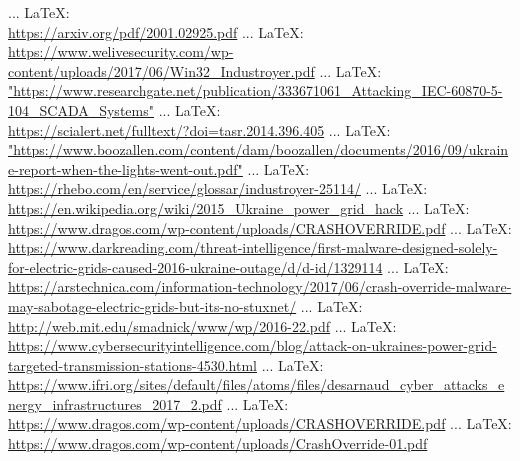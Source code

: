 \begin{thebibliography}{99}
{{{{		 ... \LaTeX:\\ \url{https://arxiv.org/pdf/2001.02925.pdf}
		 ... \LaTeX:\\ \url{https://www.welivesecurity.com/wp-content/uploads/2017/06/Win32_Industroyer.pdf}
		 ... \LaTeX:\\ \url{"https://www.researchgate.net/publication/333671061_Attacking_IEC-60870-5-104_SCADA_Systems"}
		 ... \LaTeX:\\ \url{https://scialert.net/fulltext/?doi=tasr.2014.396.405}
		 ... \LaTeX:\\ \url{"https://www.boozallen.com/content/dam/boozallen/documents/2016/09/ukraine-report-when-the-lights-went-out.pdf"}
		 ... \LaTeX:\\ \url{https://rhebo.com/en/service/glossar/industroyer-25114/}
		 ... \LaTeX:\\ \url{https://en.wikipedia.org/wiki/2015_Ukraine_power_grid_hack}
		 ... \LaTeX:\\ \url{https://www.dragos.com/wp-content/uploads/CRASHOVERRIDE.pdf}
		 ... \LaTeX:\\ \url{https://www.darkreading.com/threat-intelligence/first-malware-designed-solely-for-electric-grids-caused-2016-ukraine-outage/d/d-id/1329114}
		 ... \LaTeX:\\ \url{https://arstechnica.com/information-technology/2017/06/crash-override-malware-may-sabotage-electric-grids-but-its-no-stuxnet/}
		 ... \LaTeX:\\ \url{http://web.mit.edu/smadnick/www/wp/2016-22.pdf}
		 ... \LaTeX:\\ \url{https://www.cybersecurityintelligence.com/blog/attack-on-ukraines-power-grid-targeted-transmission-stations-4530.html}
		 ... \LaTeX:\\ \url{https://www.ifri.org/sites/default/files/atoms/files/desarnaud_cyber_attacks_energy_infrastructures_2017_2.pdf}
		 ... \LaTeX:\\ \url{https://www.dragos.com/wp-content/uploads/CRASHOVERRIDE.pdf}
		 ... \LaTeX:\\ \url{https://www.dragos.com/wp-content/uploads/CrashOverride-01.pdf}
}}}}
\end{thebibliography}
